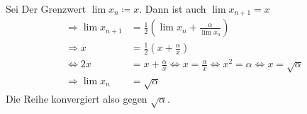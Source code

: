 \begin{lsg}
Sei Der Grenzwert $\lim x_n \coloneqq x$. Dann ist auch $\lim x_{n+1} = x$
\begin{align*}
    \Rightarrow \lim x_{n+1} &= \frac12 \left(\lim x_n + \frac{\alpha}{\lim x_n}\right) \\
    \Rightarrow x &= \frac12 \left(x + \frac{\alpha}{x}\right) \\
    \Leftrightarrow 2x &= x + \frac{\alpha}{x} \Leftrightarrow x = \frac{\alpha}{x} \Leftrightarrow x^2 = \alpha \Leftrightarrow x = \sqrt{\alpha} \\
    \Rightarrow \lim x_n &= \sqrt{\alpha}
\end{align*}
Die Reihe konvergiert also gegen $\sqrt{\alpha}$.
\end{lsg}



